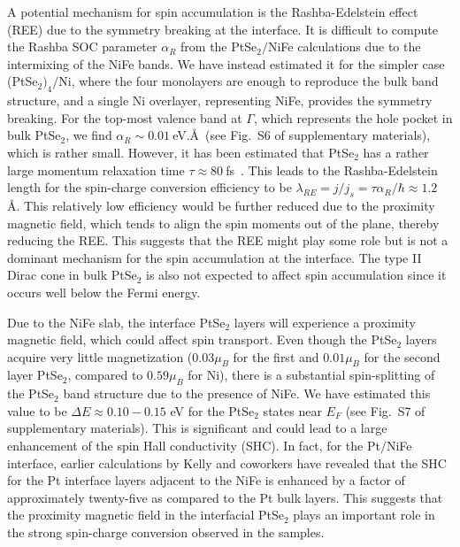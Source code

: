 \documentclass[journal=jacsat,manuscript=article]{achemso}
\begin{document}
A potential mechanism for spin accumulation is the Rashba-Edelstein effect (REE)
due to the symmetry breaking at the interface.
It is difficult to compute the Rashba SOC parameter $\alpha_R$ from the PtSe$_2/$NiFe calculations due to the intermixing of the NiFe bands. 
We have instead estimated it
for the simpler case (PtSe$_2)_4 /$Ni, where
the four monolayers are enough to reproduce the bulk band structure, and a single Ni overlayer, representing NiFe, provides the symmetry breaking. 
For the top-most valence band at $\Gamma$, which represents the hole  pocket
in bulk  PtSe$_2$, we find $\alpha_R \sim 0.01 \ $eV.\AA~(see Fig.~S6 of supplementary materials),
which is rather small. However, it has been estimated that PtSe$_2$ has a rather large  momentum relaxation time $\tau \approx 80\ $fs~\cite{kurpas2021intrinsic}.
%
This leads to the Rashba-Edelstein length for the spin-charge conversion efficiency
to be
$\lambda_{RE} = j/j_s = \tau \alpha_R/\hbar \approx 1.2\ $ \AA. 
This relatively low efficiency would be further reduced due to the proximity magnetic field, which tends to align the spin moments out of the plane, thereby reducing the REE. 
This suggests that the REE might play some role but is not a dominant mechanism for the spin accumulation at the interface. The type II Dirac cone in bulk PtSe$_2$ is also not expected to affect spin accumulation since it occurs well below the Fermi energy.


    
Due to the NiFe slab, the interface PtSe$_2$ layers will experience a  proximity magnetic field, which could affect spin transport.
Even though the PtSe$_2$ layers acquire very little magnetization ($0.03 \mu_B$ for the first and $0.01 \mu_B$ for the second layer PtSe$_2$, compared to $0.59 \mu_B$ for Ni), there is a substantial spin-splitting of the PtSe$_2$ band structure due to the  presence of NiFe.
We have estimated this value to be 
 $\Delta E \approx 0.10- 0.15 $ eV
 for the PtSe$_2$ states near $E_F$ (see Fig.~S7 of supplementary materials). 
 This is significant and could lead to a large enhancement of the spin Hall conductivity (SHC).
 In fact, for the Pt$/$NiFe interface, earlier calculations by Kelly and coworkers\cite{wang2016giant} have revealed that the SHC for the Pt interface layers adjacent to the NiFe
 is enhanced by a factor of approximately twenty-five as compared to the Pt bulk layers. This suggests that the proximity magnetic field in the interfacial PtSe$_2$ plays an important role in the strong spin-charge conversion observed in the samples.
\end{document}

